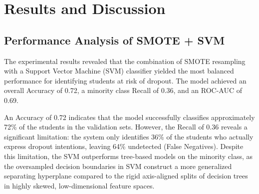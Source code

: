 \documentclass[12pt,journal,compsoc]{IEEEtran}
\begin{document}
\section{Results and Discussion}
\label{sec:results_discussion}

\subsection{Performance Analysis of SMOTE + SVM}
\label{subsec:svm_performance}
The experimental results revealed that the combination of SMOTE resampling with a Support Vector Machine (SVM) classifier yielded the most balanced performance for identifying students at risk of dropout. The model achieved an overall Accuracy of 0.72, a minority class Recall of 0.36, and an ROC-AUC of 0.69. 

An Accuracy of 0.72 indicates that the model successfully classifies approximately 72\% of the students in the validation sets. However, the Recall of 0.36 reveals a significant limitation: the system only identifies 36\% of the students who actually express dropout intentions, leaving 64\% undetected (False Negatives). Despite this limitation, the SVM outperforms tree-based models on the minority class, as the oversampled decision boundaries in SVM construct a more generalized separating hyperplane compared to the rigid axis-aligned splits of decision trees in highly skewed, low-dimensional feature spaces.
\end{document}
